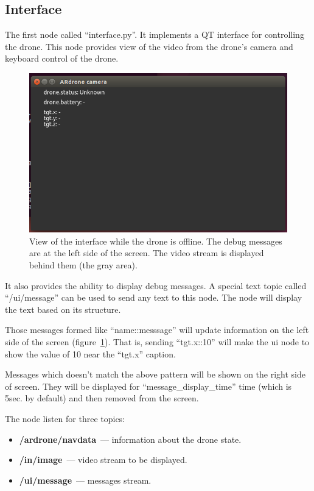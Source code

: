 \documentclass[12pt]{article}
\begin{document}
    \subsection{Interface}
    \label{ssec:interface}

    The first node called ``interface.py''. It implements a QT interface for
    controlling the drone. This node provides view of the video from the drone's
    camera and keyboard control of the drone.

    \begin{figure}[htbp]
        \noindent\centering
            \includegraphics[width=.7\textwidth]{ui.png}
        \caption{View of the interface while the drone is offline.
        The debug messages are at the left side of the screen. The video stream
        is displayed behind them (the gray area).}
        \label{fig:ui}
    \end{figure}

    It also provides the ability to display debug messages. A special text
    topic called ``/ui/message'' can be used to send any text to this node.
    The node will display the text based on its structure.
    
    Those messages formed like ``name::messsage'' will update information
    on the left side of the screen (figure~\ref{fig:ui}). That is, sending ``tgt.x::10'' will make
    the ui node to show the value of 10 near the ``tgt.x'' caption.

    Messages which doesn't match the above pattern will be shown on the right
    side of screen. They will be displayed for ``message\_display\_time'' time
    (which is 5sec. by default) and then removed from the screen.

    The node listen for three topics:

    \begin{itemize}
        \item {\bf /ardrone/navdata}~--- information about the drone state.
        \item {\bf /in/image}~--- video stream to be displayed.
        \item {\bf /ui/message}~--- messages stream.
    \end{itemize}
\end{document}
